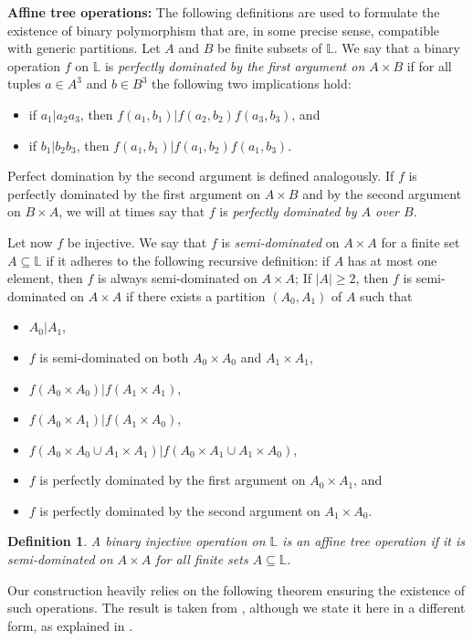 \documentclass[a4paper,reqno, cleveref]{amsart}
\newtheorem{definition}[theorem]{Definition}
\newcommand{\sL}{\mathbb L}
\begin{document}
\textbf{Affine tree operations:} The following definitions are used to formulate the existence of binary polymorphism that are, in some precise sense, compatible with generic partitions. 
Let $A$ and $B$ be finite subsets of $\sL$. We say that a binary operation $f$ on $\sL$ is \emph{perfectly dominated by the first argument on $A\times B$} if for all tuples $a\in A^3$ and $b\in B^3$ the following two implications hold: \begin{itemize}
    \item if $a_1|a_2a_3$, then $f(a_1,b_1)|f(a_2,b_2)f(a_3,b_3)$, and
    \item if $b_1|b_2 b_3$, then $f(a_1,b_1)|f(a_1,b_2)f(a_1,b_3)$. 
\end{itemize} 
Perfect domination by the second argument is defined analogously. If $f$ is perfectly dominated by the first argument on $A\times B$ and by the second argument on $B\times A$,  we will at times say that $f$  is \emph{perfectly dominated by $A$ over $B$}.

Let now $f$ be injective. We say that $f$ is \emph{semi-dominated} on $A\times A$ for a finite set $A\subseteq\sL$ if it adheres to the following recursive definition: if $A$ has at most one element, then $f$ is always semi-dominated on $A\times A$; 
%
If $|A|\geq 2$, then $f$ is semi-dominated on $A\times A$ if there exists a partition $(A_0,A_1)$ of $A$ such that \begin{itemize}
    \item $A_0|A_1$,
    \item $f$ is semi-dominated on both $A_0\times A_0$ and $A_1\times A_1$,
    \item $f(A_0\times A_0)|f(A_1\times A_1)$,
    \item $f(A_0\times A_1)|f(A_1\times A_0)$,
    \item $f(A_0\times A_0\cup A_1\times A_1)|f(A_0\times A_1\cup A_1\times A_0)$, 
    \item $f$ is perfectly dominated by the first argument on $A_0\times A_1$, and
    \item $f$ is perfectly dominated by the second argument on $A_1\times A_0$.
\end{itemize} 
%
\begin{definition}
    A binary injective operation on $\sL$ is an \emph{affine tree operation} if it is semi-dominated on $A\times A$ for all finite sets $A\subseteq\sL$. 
\end{definition}


Our construction heavily relies on the following theorem ensuring the existence of such operations. The result is taken from \cite{Phylo-Complexity}, although we state it here in a different form, as explained in .
 
\end{document}
